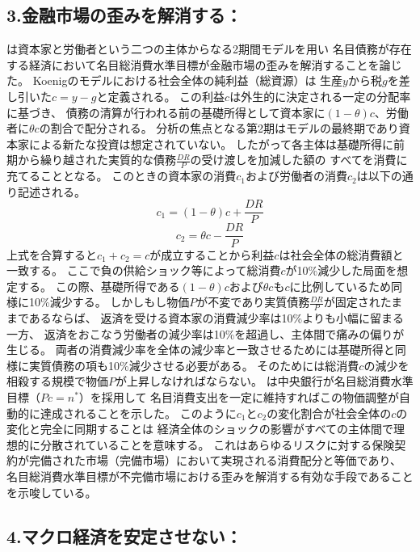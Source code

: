 \subsection{3.金融市場の歪みを解消する：\textcite{Koenig2013}}
\label{sec:review_koenig_2013}
\textcite{Koenig2013}は資本家と労働者という二つの主体からなる2期間モデルを用い
名目債務が存在する経済において名目総消費水準目標が金融市場の歪みを解消することを論じた。
Koenigのモデルにおける社会全体の純利益（総資源）は
生産\(y\)から税\(g\)を差し引いた\(c=y-g\)と定義される。
この利益\(c\)は外生的に決定される一定の分配率に基づき、
債務の清算が行われる前の基礎所得として資本家に\((1-\theta)c\)、労働者に\(\theta c\)の割合で配分される。
分析の焦点となる第2期はモデルの最終期であり資本家による新たな投資は想定されていない。
したがって各主体は基礎所得に前期から繰り越された実質的な債務\(\frac{DR}{P}\)の受け渡しを加減した額の
すべてを消費に充てることとなる。
このときの資本家の消費\(c_1\)および労働者の消費\(c_2\)は以下の通り記述される。
\begin{equation}
c_1=(1-\theta)c+\frac{DR}{P}
\end{equation}
\begin{equation}
c_2=\theta c-\frac{DR}{P}
\end{equation}
上式を合算すると\(c_1+c_2=c\)が成立することから利益\(c\)は社会全体の総消費額と一致する。
ここで負の供給ショック等によって総消費\(c\)が10\%減少した局面を想定する。
この際、基礎所得である\((1-\theta)c\)および\(\theta c\)も\(c\)に比例しているため同様に10\%減少する。
しかしもし物価\(P\)が不変であり実質債務\(\frac{DR}{P}\)が固定されたままであるならば、
返済を受ける資本家の消費減少率は10\%よりも小幅に留まる一方、
返済をおこなう労働者の減少率は10\%を超過し、主体間で痛みの偏りが生じる。
両者の消費減少率を全体の減少率と一致させるためには基礎所得と同様に実質債務の項も10\%減少させる必要がある。
そのためには総消費\(c\)の減少を相殺する規模で物価\(P\)が上昇しなければならない。
\textcite{Koenig2013}は中央銀行が名目総消費水準目標（\(Pc=n^*\)）を採用して
名目消費支出を一定に維持すればこの物価調整が自動的に達成されることを示した。
このように\(c_1\)と\(c_2\)の変化割合が社会全体の\(c\)の変化と完全に同期することは
経済全体のショックの影響がすべての主体間で理想的に分散されていることを意味する。
これはあらゆるリスクに対する保険契約が完備された市場（完備市場）において実現される消費配分と等価であり、
名目総消費水準目標が不完備市場における歪みを解消する有効な手段であることを示唆している。

\subsection{4.マクロ経済を安定させない：\textcite{Chen2019}}
\label{sec:review_chen_2019}



